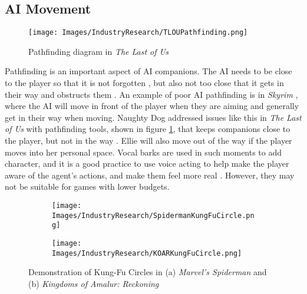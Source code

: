 \documentclass{IEEEtran}
\begin{document}

\subsection{AI Movement}
\label{Movement}

\begin{figure}
  \centering
  \texttt{[image: Images/IndustryResearch/TLOUPathfinding.png]}
  
\caption{Pathfinding diagram in \textit{The Last of Us}}
\label{fig:TLOUPathfinding}
\end{figure}

Pathfinding is an important aspect of AI companions. The AI needs to be close to the player so that it is not forgotten \cite{GAIP2EllieAI}, but also not too close that it gets in their way and obstructs them \cite{CoupledEmpowermentMaximisation}. An example of poor AI pathfinding is in \textit{Skyrim} \cite{tremblay2013adaptive}, where the AI will move in front of the player when they are aiming and generally get in their way when moving. Naughty Dog addressed issues like this in \textit{The Last of Us} with pathfinding tools, shown in figure \ref{fig:TLOUPathfinding}, that keeps companions close to the player, but not in the way \cite{GAIP2EllieAI}. Ellie will also move out of the way if the player moves into her personal space. Vocal barks are used in such moments to add character, and it is a good practice to use voice acting to help make the player aware of the agent’s actions, and make them feel more real \cite{GMTGoodAI}. However, they may not be suitable for games with lower budgets.

\begin{figure}
  \centering
  
  \begin{subfigure}[a]{\linewidth}
  \texttt{[image: Images/IndustryResearch/SpidermanKungFuCircle.png]}
  \end{subfigure}
  
  \begin{subfigure}[b]{\linewidth}
  \texttt{[image: Images/IndustryResearch/KOARKungFuCircle.png]}
  \end{subfigure}
  
  \caption{Demonstration of Kung-Fu Circles in (a) \textit{Marvel's Spiderman} and (b) \textit{Kingdoms of Amalur: Reckoning}}
  \label{fig:KungFuCircle}
\end{figure}
\end{document}
